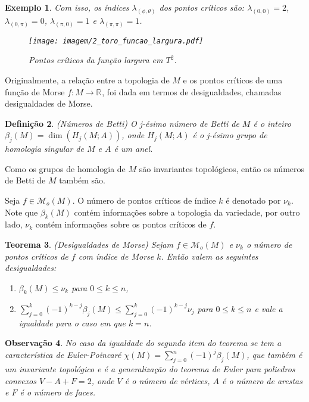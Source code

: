 \documentclass[12pt]{book}
\newtheorem{teorema}{Teorema}[section]
\newtheorem{definicao}[teorema]{Definição}
\newtheorem{exemplo}[teorema]{Exemplo}
\newtheorem{observacao}[teorema]{Observação}
\newcommand{\funcoesmorse}[1]{\mathcal{M}_{o}(#1)}
\newcommand{\real}[1]{\mathbb{R}^{#1}}
\newcommand{\reta}{\real{}}
\begin{document}
\begin{exemplo}
			Com isso, os índices $\lambda_{(\phi, \theta)}$ dos pontos críticos são: $\lambda_{(0,0)} = 2$, $\lambda_{(0,\pi)} = 0$, $\lambda_{(\pi,0)} = 1$ e $\lambda_{(\pi,\pi)} = 1$.
			
			\begin{figure}[!h]
				\centering
				\texttt{[image: imagem/2\_toro\_funcao\_largura.pdf]}
				\caption{Pontos críticos da função largura em $T^{2}$.}
				\label{figura_toro_funcao_altura}
			\end{figure}
	\end{exemplo}

	Originalmente, a relação entre a topologia de $M$ e os pontos críticos de uma função de Morse $f:M \to \reta$, foi dada em termos de desigualdades, chamadas desigualdades de Morse.
	
	\begin{definicao}
		(Números de Betti) O j-ésimo número de Betti de $M$ é o inteiro $\beta_{j}(M) = \dim(H_{j}(M;A))$, onde $H_{j}(M;A)$ é o j-ésimo grupo de homologia singular de $M$ e $A$ é um anel.
	\end{definicao}
	
	Como os grupos de homologia de $M$ são invariantes topológicos, então os números de Betti de $M$ também são.
	
	Seja $f \in \funcoesmorse{M}$. O número de pontos críticos de índice $k$ é denotado por $\nu_{k}$. Note que $\beta_{k}(M)$ contém informações sobre a topologia da variedade, por outro lado, $\nu_{k}$ contém informações sobre os pontos críticos de $f$.
	
	\begin{teorema}
		(Desigualdades de Morse) Sejam $f \in \funcoesmorse{M}$ e $\nu_{k}$ o número de pontos críticos de $f$ com índice de Morse $k$. Então valem as seguintes desigualdades:
		\begin{enumerate}
			\item $\beta_{k}(M) \leq \nu_{k}$ para $0\leq k\leq n$,
			
			\item $\sum_{j = 0}^{k}(-1)^{k-j}\beta_{j}(M) \leq \sum_{j = 0}^{k}(-1)^{k-j}\nu_{j} $ para $0 \leq k \leq n$ e vale a igualdade para o caso em que $k=n$.
		\end{enumerate}
	\end{teorema}
	
	\begin{observacao}
		No caso da igualdade do segundo item do teorema se tem a característica de Euler-Poincaré $\chi(M) = \sum_{j = 0}^{n}(-1)^{j}\beta_{j}(M)$, que também é um invariante topológico e é a generalização do teorema de Euler para poliedros convexos $V-A+F = 2$, onde $V$ é o número de vértices, $A$ é o número de arestas e $F$ é o número de faces.
	\end{observacao}
	
\end{document}
